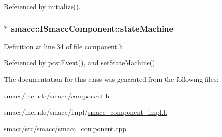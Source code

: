Referenced by initialize().

\subsubsection[{\texorpdfstring{state\+Machine\+\_\+}{stateMachine_}}]{$\ast$ smacc\+::\+I\+Smacc\+Component\+::state\+Machine\+\_\+\hspace{0.3cm}{\ttfamily [protected]}}\hypertarget{classsmacc_1_1ISmaccComponent_ae3f37acc1679f79299b86872d4b1f80f}{}\label{classsmacc_1_1ISmaccComponent_ae3f37acc1679f79299b86872d4b1f80f}


Definition at line 34 of file component.\+h.



Referenced by post\+Event(), and set\+State\+Machine().



The documentation for this class was generated from the following files\+:\begin{DoxyCompactItemize}
\item 
smacc/include/smacc/\hyperlink{component_8h}{component.\+h}\item 
smacc/include/smacc/impl/\hyperlink{smacc__component__impl_8h}{smacc\+\_\+component\+\_\+impl.\+h}\item 
smacc/src/smacc/\hyperlink{smacc__component_8cpp}{smacc\+\_\+component.\+cpp}\end{DoxyCompactItemize}
